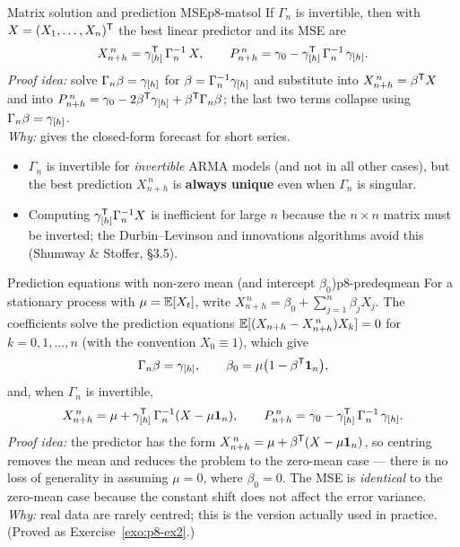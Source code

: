 \begin{corollary}{Matrix solution and prediction MSE}{p8-matsol}
If $\Gamma_n$ is invertible, then with $X=(X_1,\dots,X_n)^{\mathsf{T}}$ the best linear
predictor and its MSE are
\[
X^{\,n}_{n+h}=\gamma_{[h]}^{\mathsf{T}}\,\Gamma_n^{-1}\,X,
\qquad
P^{\,n}_{n+h}=\gamma_0-\gamma_{[h]}^{\mathsf{T}}\,\Gamma_n^{-1}\,\gamma_{[h]} .
\]
\textit{Proof idea:} solve $\Gamma_n\beta=\gamma_{[h]}$ for
$\beta=\Gamma_n^{-1}\gamma_{[h]}$ and substitute into
$X^{\,n}_{n+h}=\beta^{\mathsf{T}} X$ and into
$P^{\,n}_{n+h}=\gamma_0-2\beta^{\mathsf{T}}\gamma_{[h]}+\beta^{\mathsf{T}}\Gamma_n\beta$; the last
two terms collapse using $\Gamma_n\beta=\gamma_{[h]}$.\\[2pt]
\textit{Why:} gives the closed-form forecast for short series.
\begin{itemize}
  \item $\Gamma_n$ is invertible for \emph{invertible} ARMA models (and not in
        all other cases), but the best prediction $X^{\,n}_{n+h}$ is
        \textbf{always unique} even when $\Gamma_n$ is singular.
  \item Computing $\gamma_{[h]}^{\mathsf{T}}\Gamma_n^{-1}X$ is inefficient for large $n$
        because the $n\times n$ matrix must be inverted; the Durbin--Levinson
        and innovations algorithms avoid this (Shumway \& Stoffer, \S3.5).
\end{itemize}
\end{corollary}

\begin{theorem}{Prediction equations with non-zero mean (and intercept $\beta_0$)}{p8-predeqmean}
For a stationary process with $\mu=\mathbb{E}[X_t]$, write
$X^{\,n}_{n+h}=\beta_0+\sum_{j=1}^n\beta_j X_j$. The coefficients solve the
prediction equations $\mathbb{E}[(X_{n+h}-X^{\,n}_{n+h})X_k]=0$ for $k=0,1,\dots,n$
(with the convention $X_0\equiv1$), which give
\[
\Gamma_n\beta=\gamma_{[h]},
\qquad
\beta_0=\mu\big(1-\beta^{\mathsf{T}}\mathbf 1_n\big),
\]
and, when $\Gamma_n$ is invertible,
\[
X^{\,n}_{n+h}=\mu+\gamma_{[h]}^{\mathsf{T}}\,\Gamma_n^{-1}(X-\mu\mathbf 1_n),
\qquad
P^{\,n}_{n+h}=\gamma_0-\gamma_{[h]}^{\mathsf{T}}\,\Gamma_n^{-1}\,\gamma_{[h]} .
\]
\textit{Proof idea:} the predictor has the form
$X^{\,n}_{n+h}=\mu+\beta^{\mathsf{T}}(X-\mu\mathbf 1_n)$, so centring removes the mean and
reduces the problem to the zero-mean case --- there is no loss of generality in
assuming $\mu=0$, where $\beta_0=0$. The MSE is \emph{identical} to the
zero-mean case because the constant shift does not affect the error variance.\\[2pt]
\textit{Why:} real data are rarely centred; this is the version actually used in
practice. (Proved as Exercise~\ref{exo:p8-ex2}.)
\end{theorem}

